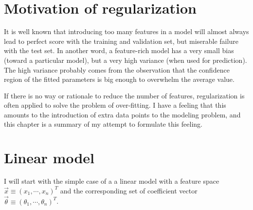 \section{Motivation of regularization}
It is well known that introducing too many features in a model will almost always lead to perfect score with the training and validation set, but miserable failure with the test set. In another word, a feature-rich model has a very small bias (toward a particular model), but a very high variance (when used for prediction). The high variance probably comes from the observation that the confidence region of the fitted parameters is big enough to overwhelm the average value.

If there is no way or rationale to reduce the number of features, regularization is often applied to solve the problem of over-fitting. I have a feeling that this amounts to the introduction of extra data points to the modeling problem, and this chapter is a summary of my attempt to formulate this feeling.

\section{Linear model}
I will start with the simple case of a a linear model with a feature space $\vec x \equiv(x_1, \cdots, x_n)^T$ and the corresponding set of coefficient vector $\vec\theta\equiv(\theta_1, \cdots, \theta_n)^T$.